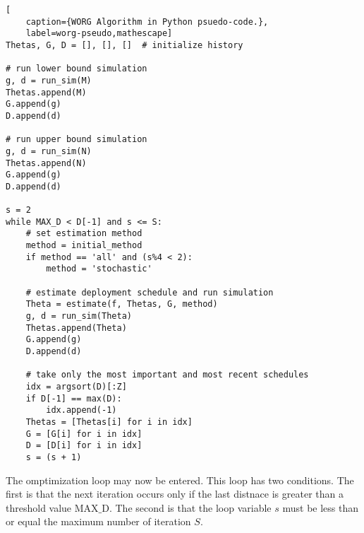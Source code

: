 \clearpage
\begin{lstlisting}[
    caption={WORG Algorithm in Python psuedo-code.},
    label=worg-pseudo,mathescape]
Thetas, G, D = [], [], []  # initialize history

# run lower bound simulation
g, d = run_sim(M)
Thetas.append(M)
G.append(g)
D.append(d)

# run upper bound simulation    
g, d = run_sim(N)
Thetas.append(N)
G.append(g)
D.append(d)

s = 2
while MAX_D < D[-1] and s <= S:
    # set estimation method
    method = initial_method
    if method == 'all' and (s%4 < 2):
        method = 'stochastic'

    # estimate deployment schedule and run simulation
    Theta = estimate(f, Thetas, G, method)
    g, d = run_sim(Theta)
    Thetas.append(Theta)
    G.append(g)
    D.append(d)

    # take only the most important and most recent schedules
    idx = argsort(D)[:Z]
    if D[-1] == max(D):
        idx.append(-1)
    Thetas = [Thetas[i] for i in idx]
    G = [G[i] for i in idx]
    D = [D[i] for i in idx]
    s = (s + 1)
\end{lstlisting}
\clearpage

The omptimization loop may now be entered.  This loop has two conditions.
The first is that the next iteration occurs only if the last distnace
is greater than a threshold value $\mathrm{MAX\_D}$. The second is that 
the loop variable $s$ must be less than or equal the maximum number
of iteration $S$.


